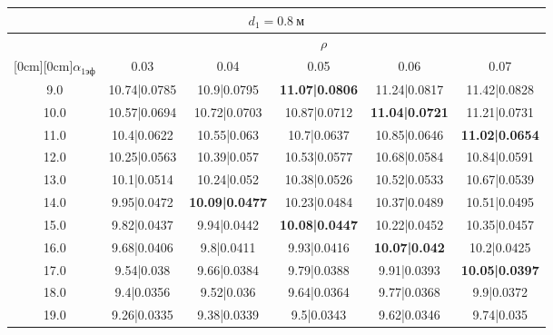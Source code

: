 \documentclass[20pt]{article}
\begin{document}
\begin{center}
\begin{tabular}{c|ccccc}
\hline
	\multicolumn{6}{c}{$d_{1}=0.8 \ м$} \\
\hline
	 & \multicolumn{5}{|c}{$\rho$} \\
	\cline{2-6}
	\raisebox{1.5ex}[0cm][0cm]{$\alpha_{1эф}$} & 0.03 & 0.04 & 0.05 & 0.06 & 0.07\\
\hline
	9.0 & 	10.74|0.0785 & 	10.9|0.0795 & 	\textbf{11.07|0.0806} & 	11.24|0.0817 & 	11.42|0.0828\\
	10.0 & 	10.57|0.0694 & 	10.72|0.0703 & 	10.87|0.0712 & 	\textbf{11.04|0.0721} & 	11.21|0.0731\\
	11.0 & 	10.4|0.0622 & 	10.55|0.063 & 	10.7|0.0637 & 	10.85|0.0646 & 	\textbf{11.02|0.0654}\\
	12.0 & 	10.25|0.0563 & 	10.39|0.057 & 	10.53|0.0577 & 	10.68|0.0584 & 	10.84|0.0591\\
	13.0 & 	10.1|0.0514 & 	10.24|0.052 & 	10.38|0.0526 & 	10.52|0.0533 & 	10.67|0.0539\\
	14.0 & 	9.95|0.0472 & 	\textbf{10.09|0.0477} & 	10.23|0.0484 & 	10.37|0.0489 & 	10.51|0.0495\\
	15.0 & 	9.82|0.0437 & 	9.94|0.0442 & 	\textbf{10.08|0.0447} & 	10.22|0.0452 & 	10.35|0.0457\\
	16.0 & 	9.68|0.0406 & 	9.8|0.0411 & 	9.93|0.0416 & 	\textbf{10.07|0.042} & 	10.2|0.0425\\
	17.0 & 	9.54|0.038 & 	9.66|0.0384 & 	9.79|0.0388 & 	9.91|0.0393 & 	\textbf{10.05|0.0397}\\
	18.0 & 	9.4|0.0356 & 	9.52|0.036 & 	9.64|0.0364 & 	9.77|0.0368 & 	9.9|0.0372\\
	19.0 & 	9.26|0.0335 & 	9.38|0.0339 & 	9.5|0.0343 & 	9.62|0.0346 & 	9.74|0.035\\
\end{tabular}


\end{center}
\end{document}
